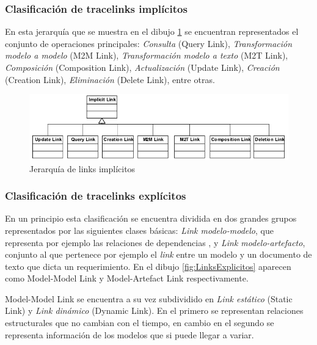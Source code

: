 \documentclass[a4paper,12pt,oneside,spanish]{book}
\begin{document}
\subsubsection{Clasificación de tracelinks implícitos}


En esta jerarquía que se muestra en el dibujo \ref{fig:LinksImplicitos} se encuentran representados el conjunto de operaciones  principales: \textit{Consulta} (\textsf{Query Link}), \textit{Transformación modelo a modelo} (\textsf{M2M Link}), \textit{Transformación modelo a texto} (\textsf{M2T Link}), \textit{Composición} (\textsf{Composition Link}), \textit{Actualización} (\textsf{Update Link}), \textit{Creación} (\textsf{Creation Link}), \textit{Eliminación} (\textsf{Delete Link}), entre otras.


\begin{figure}[hbtp]
\centering
\includegraphics[scale=0.56]{./img/ImplicitTraceLinks}
\caption{Jerarquía de links implícitos}
\label{fig:LinksImplicitos}
\end{figure}


\subsubsection{Clasificación de tracelinks explícitos}

En un principio esta clasificación se encuentra dividida en dos grandes grupos representados por las siguientes clases básicas: \textit{Link modelo-modelo}, que representa por ejemplo las relaciones de dependencias , y \textit{Link modelo-artefacto}, conjunto al que pertenece por ejemplo el \textit{link} entre un modelo y un documento de texto que dicta un requerimiento. En el dibujo \ref{fig:LinksExplicitos} aparecen como \textsf{Model-Model Link} y \textsf{Model-Artefact Link} respectivamente.

\textsf{Model-Model Link} se encuentra a su vez subdividido en \textit{Link estático} (\textsf{Static Link}) y \textit{Link dinámico} (\textsf{Dynamic Link}). En el primero se representan relaciones estructurales que no cambian con el tiempo, en cambio en el segundo se representa información de los modelos que si puede llegar a variar.
\end{document}
